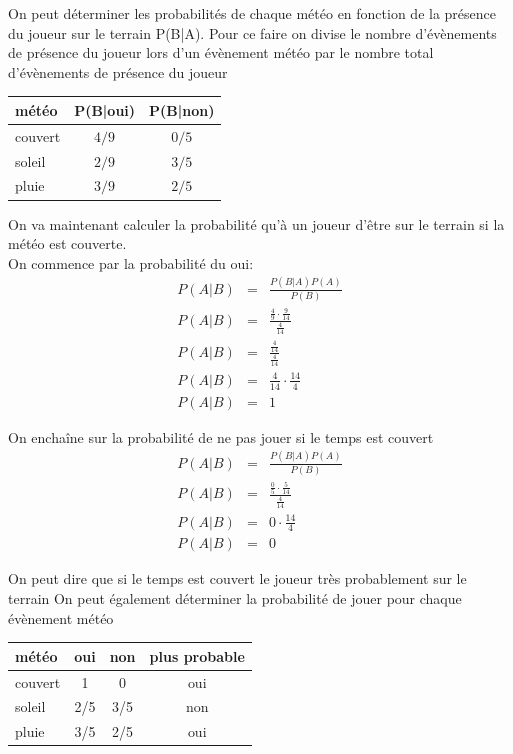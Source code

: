 \documentclass[a4paper,12pt]{article}
\begin{document}
				On peut déterminer les probabilités de chaque météo en fonction de la présence du joueur sur le terrain P(B|A). Pour ce faire on divise le nombre d'évènements de présence du joueur lors d'un évènement météo par le nombre total d'évènements de présence du joueur
				
				\begin{table}[H]
					\centering
					 \label{tab:pba}
					\begin{tabular}{|l|c|c|}
						\hline
						météo & P(B|oui) & P(B|non) \\
						\hline
						couvert & $4/9$ & $0/5$ \\
						\hline
						soleil & $2/9$ & $3/5$ \\
						\hline
						pluie & $3/9$ & $2/5$ \\
						\hline	
					\end{tabular}
				\end{table}
				
				On va maintenant calculer la probabilité qu'à un joueur d'être sur le terrain si la météo est couverte.\\
				On commence par la probabilité du oui:
				\begin{eqnarray*}
					P(A|B) &=& \frac{P(B|A)P(A)}{P(B)}\\
					P(A|B) &=& \frac{\frac{4}{9}\cdot\frac{9}{14}}{\frac{4}{14}}\\
					P(A|B) &=& \frac{\frac{4}{14}}{\frac{4}{14}}\\
					P(A|B) &=& \frac{4}{14}\cdot\frac{14}{4}\\
					P(A|B) &=& 1
				\end{eqnarray*}
				
				On enchaîne sur la probabilité de ne pas jouer si le temps est couvert
				\begin{eqnarray*}
					P(A|B) &=& \frac{P(B|A)P(A)}{P(B)}\\
					P(A|B) &=& \frac{\frac{0}{5}\cdot\frac{5}{14}}{\frac{4}{14}}\\
					P(A|B) &=& 0\cdot\frac{14}{4}\\
					P(A|B) &=& 0
				\end{eqnarray*}	
				
				On peut dire que si le temps est couvert le joueur très probablement sur le terrain			 
				On peut également déterminer la probabilité de jouer pour chaque évènement météo
				\begin{table}[H]
					\centering
					 \label{tab:pab2}
					\begin{tabular}{|l|c|c|c|}
						\hline
						météo & oui & non & plus probable\\
						\hline
						couvert & 1 & 0 & oui\\
						\hline
						soleil & 2/5 & 3/5 & non \\
						\hline
						pluie & 3/5 & 2/5 & oui \\
						\hline
					\end{tabular}
				\end{table}
				
\end{document}
